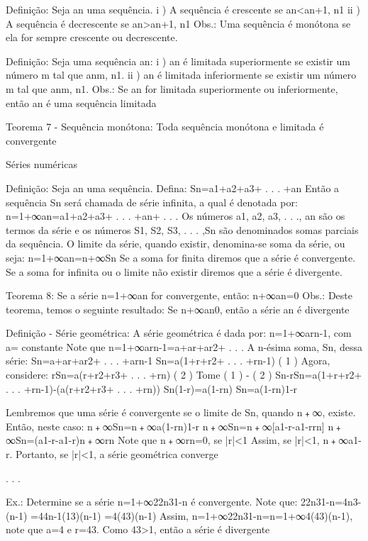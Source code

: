 Definição:
    Seja {an} uma sequência.
        i ) A sequência é crescente se an<an+1, n1
        ii ) A sequência é decrescente se an>an+1, n1
    Obs.: Uma sequência é monótona se ela for sempre crescente ou decrescente.

Definição:
    Seja uma sequência {an}:
        i ) {an} é limitada superiormente se existir um número m tal que anm, n1.
        ii ) {an} é limitada inferiormente se existir um número m tal que anm, n1.
    Obs.: Se {an} for limitada superiormente ou inferiormente, então {an} é uma sequência limitada

Teorema 7 - Sequência monótona:
    Toda sequência monótona e limitada é convergente


Séries numéricas

Definição:
    Seja {an} uma sequência. Defina:
        Sn=a1+a2+a3+ . . . +an
    Então a sequência {Sn} será chamada de série infinita, a qual é denotada por:
        n=1+∞an=a1+a2+a3+ . . . +an+ . . .
    Os números a1, a2, a3, . . ., an são os termos da série e os números S1, S2, S3,  . . . ,Sn são denominados somas parciais da sequência.
    O limite da série, quando existir, denomina-se soma da série, ou seja:
        n=1+∞an=n+∞Sn
    Se a soma for finita diremos que a série é convergente. Se a soma for infinita ou o limite não existir diremos que a série é divergente.
    
Teorema 8:
    Se a série n=1+∞an for convergente, então:
        n+∞an=0
    Obs.: 
        Deste teorema, temos o seguinte resultado:
            Se n+∞an0, então a série an é divergente

Definição - Série geométrica:
    A série geométrica é dada por:
        n=1+∞arn-1, com a= constante
    Note que n=1+∞arn-1=a+ar+ar2+ . . .
    A n-ésima soma, Sn, dessa série:
        Sn=a+ar+ar2+ . . . +arn-1
        Sn=a(1+r+r2+ . . . +rn-1) ( 1 )
    Agora, considere:
        rSn=a(r+r2+r3+ . . . +rn) ( 2 )
    Tome ( 1 ) - ( 2 )
        Sn-rSn=a(1+r+r2+ . . . +rn-1)-(a(r+r2+r3+ . . . +rn))
        Sn(1-r)=a(1-rn)
        Sn=a(1-rn)1-r




    Lembremos que uma série é convergente se o limite de Sn, quando n﹢∞, existe. Então, neste caso:
        n﹢∞Sn=n﹢∞a(1-rn)1-r
        n﹢∞Sn=n﹢∞[a1-r-a1-rrn]
        n﹢∞Sn=(a1-r-a1-r)n﹢∞rn
    Note que n﹢∞rn=0, se |r|<1
    Assim, se |r|<1, n﹢∞a1-r. 
    Portanto, se |r|<1, a série geométrica converge

. . .

    Ex.: Determine se a série n=1+∞22n31-n é convergente.
            Note que: 22n31-n=4n3-(n-1)
                                           =44n-1(13)(n-1)
                                           =4(43)(n-1)
            Assim, n=1+∞22n31-n=n=1+∞4(43)(n-1), note que a=4 e r=43. Como 43>1, então a série é divergente 

